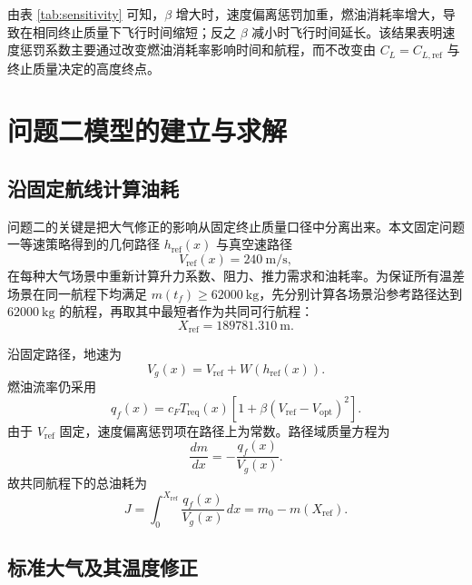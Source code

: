 \documentclass[withoutpreface,bwprint]{cumcmthesis}
\begin{document}
由表 \ref{tab:sensitivity} 可知，$\beta$ 增大时，速度偏离惩罚加重，燃油消耗率增大，导致在相同终止质量下飞行时间缩短；反之 $\beta$ 减小时飞行时间延长。该结果表明速度惩罚系数主要通过改变燃油消耗率影响时间和航程，而不改变由 $C_L=C_{L,\mathrm{ref}}$ 与终止质量决定的高度终点。

\section{问题二模型的建立与求解}

\subsection{沿固定航线计算油耗}

问题二的关键是把大气修正的影响从固定终止质量口径中分离出来。本文固定问题一等速策略得到的几何路径 $h_{\mathrm{ref}}(x)$ 与真空速路径
\begin{equation}
V_{\mathrm{ref}}(x)=240\ \mathrm{m/s},
\end{equation}
在每种大气场景中重新计算升力系数、阻力、推力需求和油耗率。为保证所有温差场景在同一航程下均满足 $m(t_f)\geq 62000\ \mathrm{kg}$，先分别计算各场景沿参考路径达到 $62000\ \mathrm{kg}$ 的航程，再取其中最短者作为共同可行航程：
\begin{equation}
X_{\mathrm{ref}}=189781.310\ \mathrm{m}.
\label{eq:q2_Xref}
\end{equation}

沿固定路径，地速为
\begin{equation}
V_g(x)=V_{\mathrm{ref}}+W(h_{\mathrm{ref}}(x)).
\end{equation}
燃油流率仍采用
\begin{equation}
q_f(x)=c_F T_{\mathrm{req}}(x)\left[1+\beta(V_{\mathrm{ref}}-V_{\mathrm{opt}})^2\right].
\label{eq:q2_fuel_flow}
\end{equation}
由于 $V_{\mathrm{ref}}$ 固定，速度偏离惩罚项在路径上为常数。路径域质量方程为
\begin{equation}
\frac{dm}{dx}=-\frac{q_f(x)}{V_g(x)}.
\label{eq:q2_dmdx}
\end{equation}
故共同航程下的总油耗为
\begin{equation}
J=\int_0^{X_{\mathrm{ref}}}\frac{q_f(x)}{V_g(x)}\,dx
=m_0-m(X_{\mathrm{ref}}).
\label{eq:q2_path_integral}
\end{equation}

\subsection{标准大气及其温度修正}
\end{document}
